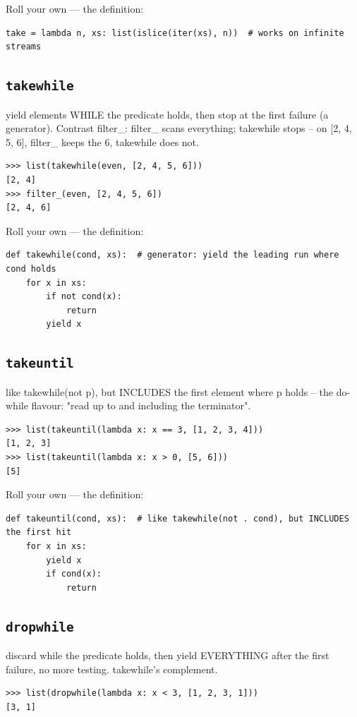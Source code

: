 \documentclass[10pt,letterpaper]{book}
\begin{document}
Roll your own --- the definition:

\begin{lstlisting}[style=ex]
take = lambda n, xs: list(islice(iter(xs), n))  # works on infinite streams
\end{lstlisting}

\subsection{\texttt{takewhile}}\label{def:takewhile}
yield elements WHILE the predicate holds, then stop at the first failure (a generator). Contrast filter\_: filter\_ scans everything; takewhile stops -- on [2, 4, 5, 6], filter\_ keeps the 6, takewhile does not.
\begin{lstlisting}[style=ex]
>>> list(takewhile(even, [2, 4, 5, 6]))
[2, 4]
>>> filter_(even, [2, 4, 5, 6])
[2, 4, 6]
\end{lstlisting}

Roll your own --- the definition:

\begin{lstlisting}[style=ex]
def takewhile(cond, xs):  # generator: yield the leading run where cond holds
    for x in xs:
        if not cond(x):
            return
        yield x
\end{lstlisting}
\subsection{\texttt{takeuntil}}\label{def:takeuntil}
like takewhile(not p), but INCLUDES the first element where p holds -- the do-while flavour: "read up to and including the terminator".
\begin{lstlisting}[style=ex]
>>> list(takeuntil(lambda x: x == 3, [1, 2, 3, 4]))
[1, 2, 3]
>>> list(takeuntil(lambda x: x > 0, [5, 6]))
[5]
\end{lstlisting}

Roll your own --- the definition:

\begin{lstlisting}[style=ex]
def takeuntil(cond, xs):  # like takewhile(not . cond), but INCLUDES the first hit
    for x in xs:
        yield x
        if cond(x):
            return
\end{lstlisting}
\subsection{\texttt{dropwhile}}\label{def:dropwhile}
discard while the predicate holds, then yield EVERYTHING after the first failure, no more testing. takewhile's complement.
\begin{lstlisting}[style=ex]
>>> list(dropwhile(lambda x: x < 3, [1, 2, 3, 1]))
[3, 1]
\end{lstlisting}
\end{document}
